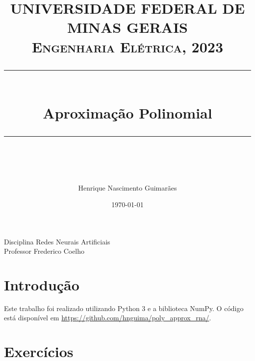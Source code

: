 \documentclass{article}
\title{
\normalfont \normalsize 
\textsc{UNIVERSIDADE FEDERAL DE MINAS GERAIS \\ 
Engenharia Elétrica, 2023} \\
[10pt] 
\rule{\linewidth}{0.5pt} \\[6pt] 
\huge Aproximação Polinomial \\
\rule{\linewidth}{2pt}  \\[10pt]
}
\author{Henrique Nascimento Guimarães}
\date{\normalsize \today}
\begin{document}
\maketitle
\noindent
Disciplina \dotfill Redes Neurais Artificiais \\
Professor \dotfill Frederico Coelho \\

\section{Introdução}

Este trabalho foi realizado utilizando Python 3 e a biblioteca NumPy. O código está disponível em \url{https://github.com/hnguima/poly_approx_rna/}.

\section{Exercícios}
\end{document}
